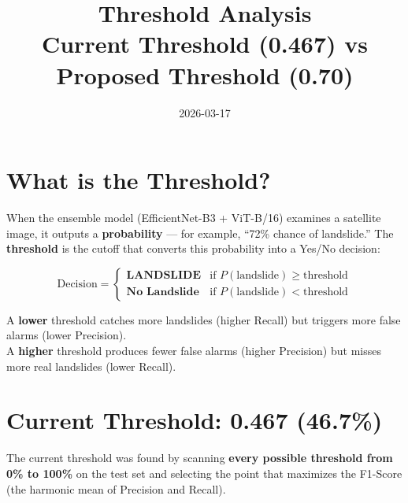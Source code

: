 \documentclass[11pt]{article}
\title{Threshold Analysis \\ \large Current Threshold (0.467) vs Proposed Threshold (0.70)}
\author{}
\date{2026-03-17}
\begin{document}
\maketitle

\section{What is the Threshold?}

When the ensemble model (EfficientNet-B3 + ViT-B/16) examines a satellite image, it outputs a \textbf{probability} --- for example, ``72\% chance of landslide.''
The \textbf{threshold} is the cutoff that converts this probability into a Yes/No decision:

\[
\text{Decision} =
\begin{cases}
    \textbf{LANDSLIDE} & \text{if } P(\text{landslide}) \geq \text{threshold} \\
    \textbf{No Landslide} & \text{if } P(\text{landslide}) < \text{threshold}
\end{cases}
\]

\noindent A \textbf{lower} threshold catches more landslides (higher Recall) but triggers more false alarms (lower Precision).\\
A \textbf{higher} threshold produces fewer false alarms (higher Precision) but misses more real landslides (lower Recall).

\section{Current Threshold: 0.467 (46.7\%)}

The current threshold was found by scanning \textbf{every possible threshold from 0\% to 100\%} on the test set and selecting the point that maximizes the F1-Score (the harmonic mean of Precision and Recall).
\end{document}
